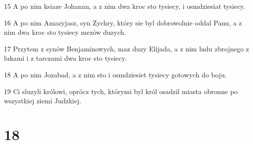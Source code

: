 \par 15 A po nim ksiaze Johanan, a z nim dwa kroc sto tysiecy, i osmdziesiat tysiecy.
\par 16 A po nim Amazyjasz, syn Zychry, który sie byl dobrowolnie oddal Panu, a z nim dwa kroc sto tysiecy mezów duzych.
\par 17 Przytem z synów Benjaminowych, maz duzy Elijada, a z nim ludu zbrojnego z lukami i z tarczami dwa kroc sto tysiecy.
\par 18 A po nim Jozabad, a z nim sto i osmdziesiet tysiecy gotowych do boju.
\par 19 Ci sluzyli królowi, oprócz tych, którymi byl król osadzil miasta obronne po wszystkiej ziemi Judzkiej.

\chapter{18}

